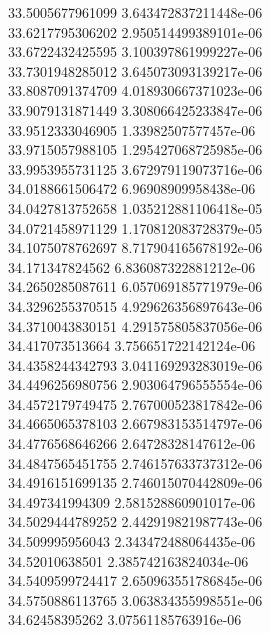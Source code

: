 {33.5005677961099 3.643472837211448e-06 \\
33.6217795306202 2.950514499389101e-06 \\
33.6722432425595 3.100397861999227e-06 \\
33.7301948285012 3.645073093139217e-06 \\
33.8087091374709 4.018930667371023e-06 \\
33.9079131871449 3.308066425233847e-06 \\
33.9512333046905 1.33982507577457e-06 \\
33.9715057988105 1.295427068725985e-06 \\
33.9953955731125 3.672979119073716e-06 \\
34.0188661506472 6.96908909958438e-06 \\
34.0427813752658 1.035212881106418e-05 \\
34.0721458971129 1.170812083728379e-05 \\
34.1075078762697 8.717904165678192e-06 \\
34.171347824562 6.836087322881212e-06 \\
34.2650285087611 6.057069185771979e-06 \\
34.3296255370515 4.929626356897643e-06 \\
34.3710043830151 4.291575805837056e-06 \\
34.417073513664 3.756651722142124e-06 \\
34.4358244342793 3.041169293283019e-06 \\
34.4496256980756 2.903064796555554e-06 \\
34.4572179749475 2.767000523817842e-06 \\
34.4665065378103 2.667983153514797e-06 \\
34.4776568646266 2.64728328147612e-06 \\
34.4847565451755 2.746157633737312e-06 \\
34.4916151699135 2.746015070442809e-06 \\
34.497341994309 2.581528860901017e-06 \\
34.5029444789252 2.442919821987743e-06 \\
34.509995956043 2.343472488064435e-06 \\
34.52010638501 2.385742163824034e-06 \\
34.5409599724417 2.650963551786845e-06 \\
34.5750886113765 3.063834355998551e-06 \\
34.62458395262 3.07561185763916e-06 \\
}
